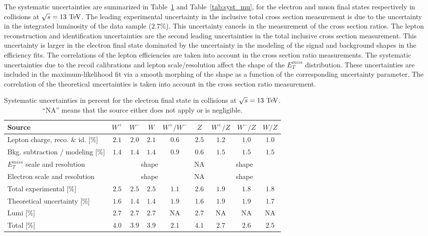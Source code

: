 The systematic uncertainties are summarized in Table~\ref{tab:syst_el} and Table~\ref{tab:syst_mu}, for the electron and muon final states respectively in collisions at $\sqrt{s}=13~\mathrm{Te\kern -0.1em V}$.  The leading experimental uncertainty in the inclusive total cross section measurement is due to the uncertainty in the integrated luminosity of the data sample ($2.7\%$). This uncertainty cancels in the measurement of the cross section ratios. The lepton reconstruction and identification uncertainties are the second leading uncertainties in the total inclusive cross section measurement. This uncertainty is larger in the electron final state dominated by the uncertainty in the modeling of the signal and background shapes in the efficiency fits. The correlations of the lepton efficiencies are taken into account in the cross section ratio measurements. The systematic uncertainties due to the recoil calibrations and lepton scale/resolution affect the shape of the $E_{T}^{miss}$ distribution. These uncertainties are included in the maximum-likelihood fit via a smooth morphing of the shape as a function of the corresponding uncertainty parameter. The correlation of the theoretical uncertainties is taken into account in the cross section ratio measurement.  
\begin{table}[htbp]
\centering
\small
\begin {tabular}  {lcccccccc}
\hline
Source & $W^+$ & $W^-$ & $W$ & $W^+/W^-$ & $Z$ & $W^+/Z$ & $W^-/Z$ & $W/Z$ \\
\hline
Lepton charge, reco. \& id. [\%] & $2.1$ & $2.0$ & $2.1$ & $0.6$ & $2.5$ & $1.2$ & $1.0$ & $1.0$ \\
Bkg. subtraction / modeling [\%] & $1.4$ & $1.4$ & $1.4$ & $0.9$ & $0.6$ & $1.5$ & $1.5$ & $1.5$ \\ 
$E_{T}^{miss}$ scale and resolution  & \multicolumn{4}{c}{shape}  & NA & \multicolumn{3}{c}{shape}  \\ 
Electron scale and resolution & \multicolumn{4}{c}{shape}  & NA & \multicolumn{3}{c}{shape}  \\ 
\hline
Total experimental [\%] & $2.5$ & $2.5$ & $2.5$ & $1.1$ & $2.6$ & $1.9$ & $1.8$ & $1.8$ \\
\hline
Theoretical uncertainty [\%] & $1.6$ & $1.4$ & $1.4$ & $1.9$ & $1.6$ & $1.9$ & $1.9$ & $1.7$ \\
\hline
Lumi [\%] & $2.7$ & $2.7$ & $2.7$ & NA & $2.7$ & NA & NA & NA \\
\hline
Total [\%] & $4.0$ & $3.9$ & $3.9$ & $2.1$ & $4.1$ & $2.7$ & $2.6$ & $2.5$ \\
\hline
\end {tabular} 
\caption[.]{ \label{tab:syst_el}
Systematic uncertainties in percent for the electron final state in collisions at $\sqrt{s}=13~\mathrm{Te\kern -0.1em V}$. ``NA'' means that the source either does not apply or is negligible.}
\end{table}

